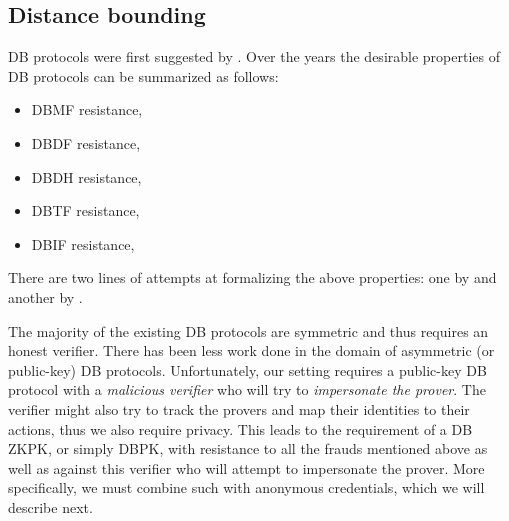 \subsection{Distance bounding}%
\label{DistanceBounding}

\Ac{DB} protocols were first suggested by \citet{DistanceBounding}.
Over the years the desirable properties of \ac{DB} protocols can be summarized 
as follows:
\begin{itemize}
  \item \ac{DBMF} resistance,
  \item \ac{DBDF} resistance,
  \item \ac{DBDH} resistance,
  \item \ac{DBTF} resistance,
  \item \ac{DBIF} resistance,
\end{itemize}
There are two lines of attempts at formalizing the above properties: one by 
\citet{DB-BMV} and another by \citet{DB-DFKO}.

The majority of the existing \ac{DB} protocols are symmetric and thus requires 
an honest verifier.
There has been less work done in the domain of asymmetric (or public-key) 
\ac{DB} protocols.
Unfortunately, our setting requires a public-key \ac{DB} protocol with a 
\emph{malicious verifier} who will try to \emph{impersonate the prover}.
The verifier might also try to track the provers and map their identities to 
their actions, thus we also require privacy.
This leads to the requirement of a \ac{DB} \ac{ZKPK}, or simply \ac{DBPK}, with 
resistance to all the frauds mentioned above as well as against this verifier 
who will attempt to impersonate the prover.
More specifically, we must combine such  with anonymous credentials, 
which we will describe next.

